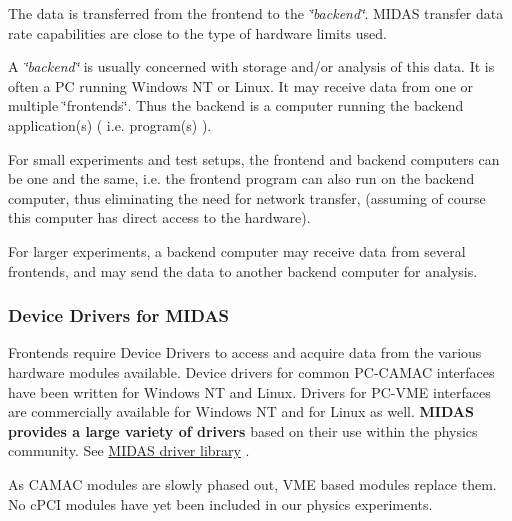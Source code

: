 The data is transferred from the frontend to the {\itshape \char`\"{}backend\char`\"{}\/}. MIDAS transfer data rate capabilities are close to the type of hardware limits used.

A {\itshape \char`\"{}backend\char`\"{}\/} is usually concerned with storage and/or analysis of this data. It is often a PC running Windows NT or Linux. It may receive data from one or multiple \char`\"{}frontends\char`\"{}. Thus the backend is a computer running the backend application(s) ( i.e. program(s) ).

For small experiments and test setups, the frontend and backend computers can be one and the same, i.e. the frontend program can also run on the backend computer, thus eliminating the need for network transfer, (assuming of course this computer has direct access to the hardware).

For larger experiments, a backend computer may receive data from several frontends, and may send the data to another backend computer for analysis.



\label{Intro_idx_device-driver}
\hypertarget{Intro_idx_device-driver}{}
 \hypertarget{Intro_I_device_drivers}{}\subsubsection{Device Drivers for MIDAS}\label{Intro_I_device_drivers}
Frontends require Device Drivers to access and acquire data from the various hardware modules available. Device drivers for common PC-\/CAMAC interfaces have been written for Windows NT and Linux. Drivers for PC-\/VME interfaces are commercially available for Windows NT and for Linux as well. {\bfseries MIDAS provides a large variety of drivers} based on their use within the physics community. See \hyperlink{FE_Hardware}{MIDAS driver library} .

As CAMAC modules are slowly phased out, VME based modules replace them. No cPCI modules have yet been included in our physics experiments.

